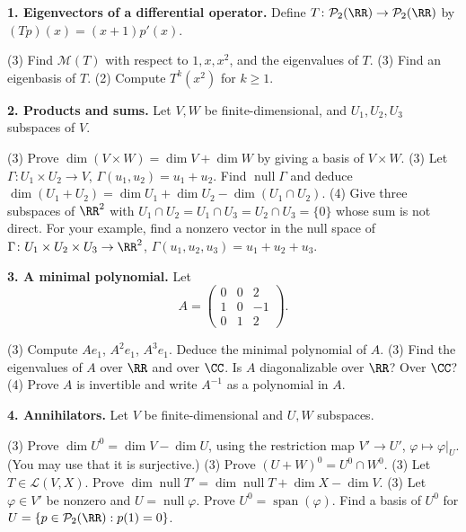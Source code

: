 \documentclass[10pt]{scrartcl}
\DeclareMathOperator{\nul}{null}
\DeclareMathOperator{\spn}{span}
\newcommand{\LL}{\mathcal L}
\newcommand{\PP}{\mathcal P}
\newcommand{\MM}{\mathcal M}
\begin{document}
\medskip\noindent\textbf{1. Eigenvectors of a differential operator.} Define $T\colon\PP_2(\RR)\to\PP_2(\RR)$ by $(Tp)(x)=(x+1)p'(x)$.
\begin{enumerate}[a)]
  \ii (3) Find $\MM(T)$ with respect to $1,x,x^2$, and the eigenvalues of $T$.
  \ii (3) Find an eigenbasis of $T$.
  \ii (2) Compute $T^k(x^2)$ for $k\ge1$.
\end{enumerate}

\medskip\noindent\textbf{2. Products and sums.} Let $V,W$ be finite-dimensional, and $U_1,U_2,U_3$ subspaces of $V$.
\begin{enumerate}[a)]
  \ii (3) Prove $\dim(V\times W)=\dim V+\dim W$ by giving a basis of $V\times W$.
  \ii (3) Let $\Gamma\colon U_1\times U_2\to V$, $\Gamma(u_1,u_2)=u_1+u_2$. Find $\nul\Gamma$ and deduce $\dim(U_1+U_2)=\dim U_1+\dim U_2-\dim(U_1\cap U_2)$.
  \ii (4) Give three subspaces of $\RR^2$ with $U_1\cap U_2=U_1\cap U_3=U_2\cap U_3=\{0\}$ whose sum is not direct. For your example, find a nonzero vector in the null space of $\Gamma\colon U_1\times U_2\times U_3\to\RR^2$, $\Gamma(u_1,u_2,u_3)=u_1+u_2+u_3$.
\end{enumerate}

\medskip\noindent\textbf{3. A minimal polynomial.} Let
\[ A=\begin{pmatrix}0&0&2\\1&0&-1\\0&1&2\end{pmatrix}. \]
\begin{enumerate}[a)]
  \ii (3) Compute $Ae_1$, $A^2e_1$, $A^3e_1$. Deduce the minimal polynomial of $A$.
  \ii (3) Find the eigenvalues of $A$ over $\RR$ and over $\CC$. Is $A$ diagonalizable over $\RR$? Over $\CC$?
  \ii (4) Prove $A$ is invertible and write $A^{-1}$ as a polynomial in $A$.
\end{enumerate}

\medskip\noindent\textbf{4. Annihilators.} Let $V$ be finite-dimensional and $U,W$ subspaces.
\begin{enumerate}[a)]
  \ii (3) Prove $\dim U^0=\dim V-\dim U$, using the restriction map $V'\to U'$, $\varphi\mapsto\varphi|_U$. (You may use that it is surjective.)
  \ii (3) Prove $(U+W)^0=U^0\cap W^0$.
  \ii (3) Let $T\in\LL(V,X)$. Prove $\dim\nul T'=\dim\nul T+\dim X-\dim V$.
  \ii (3) Let $\varphi\in V'$ be nonzero and $U=\nul\varphi$. Prove $U^0=\spn(\varphi)$. Find a basis of $U^0$ for $U=\{p\in\PP_2(\RR):p(1)=0\}$.
\end{enumerate}

\endgroup
\clearpage
\end{document}
